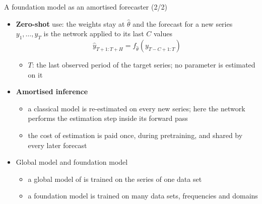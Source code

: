 \begin{frame}{A foundation model as an amortised forecaster (2/2)}
\itemsize{\small}
\begin{itemize}
    \item \textbf{Zero-shot} use: the weights stay at $\hat\theta$ and the forecast for a new series $y_1, \dots, y_T$ is the network applied to its last $C$ values \[ \hat y_{T+1:T+H} = f_{\hat\theta}(y_{T-C+1:T}) \]
    \begin{itemize}
        \item $T$: the last observed period of the target series; no parameter is estimated on it
    \end{itemize}
    \item \textbf{Amortised inference}
    \begin{itemize}
        \item a classical model is re-estimated on every new series; here the network performs the estimation step inside its forward pass
        \item the cost of estimation is paid once, during pretraining, and shared by every later forecast
    \end{itemize}
    \item Global model and foundation model
    \begin{itemize}
        \item a global model of  is trained on the series of one data set
        \item a foundation model is trained on many data sets, frequencies and domains
    \end{itemize}
\end{itemize}
\end{frame}

